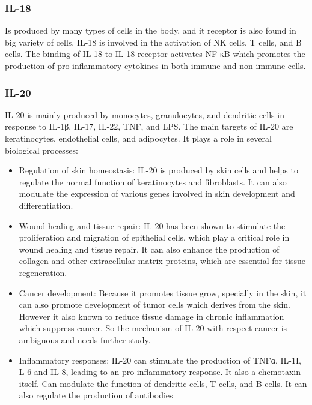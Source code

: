 \subsubsection{IL-18}
\label{in:IL18}

Is produced by many types of cells in the body, and it receptor is also found in big variety of cells. IL-18 is involved in the activation of NK cells, T cells, and B cells. The binding of IL-18 to IL-18 receptor activates NF-κB which promotes the production of pro-inflammatory cytokines in both immune and non-immune cells.


\subsubsection{IL-20}
\label{in:IL20}

IL-20 is mainly produced by monocytes, granulocytes, and dendritic cells in response to IL-1β, IL-17, IL-22, TNF, and LPS. The main targets of IL-20 are keratinocytes, endothelial cells, and adipocytes. It plays a role in several biological processes:

\begin{itemize}

    \item Regulation of skin homeostasis: IL-20 is produced by skin cells and helps to regulate the normal function of keratinocytes and fibroblasts. It can also modulate the expression of various genes involved in skin development and differentiation.
    
    \item Wound healing and tissue repair: IL-20 has been shown to stimulate the proliferation and migration of epithelial cells, which play a critical role in wound healing and tissue repair. It can also enhance the production of collagen and other extracellular matrix proteins, which are essential for tissue regeneration.
    
    \item Cancer development: Because it promotes tissue grow, specially in the skin, it can also promote development of tumor cells which derives from the skin. However it also known to reduce tissue damage in chronic inflammation which suppress cancer. So the mechanism of IL-20 with respect cancer is ambiguous and needs further study.
    
    \item Inflammatory responses: IL-20 can stimulate the production of TNFα, IL-1I, L-6 and IL-8, leading to an pro-inflammatory response. It also a chemotaxin itself. Can modulate the function of dendritic cells, T cells, and B cells. It can also regulate the production of antibodies
    
\end{itemize}






